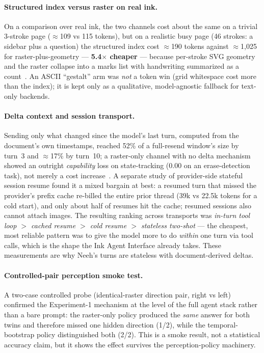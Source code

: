 \documentclass[11pt]{article}
\begin{document}
\paragraph{Structured index versus raster on real ink.} On a comparison over real
ink, the two channels cost about the same on a trivial 3-stroke page
($\approx$109 vs 115 tokens), but on a realistic busy page (46 strokes: a
sidebar plus a question) the structured index cost $\approx$190 tokens against
$\approx$1{,}025 for raster-plus-geometry --- \textbf{5.4$\times$ cheaper} ---
because per-stroke SVG geometry and the raster collapse into a marks list with
handwriting summarized as a count~\cite{adr1}. An ASCII ``gestalt'' arm was
\emph{not} a token win (grid whitespace cost more than the index); it is kept
only as a qualitative, model-agnostic fallback for text-only backends.

\paragraph{Delta context and session transport.} Sending only what changed since
the model's last turn, computed from the document's own timestamps, reached 52\%
of a full-resend window's size by turn~3 and $\approx$17\% by turn~10; a
raster-only channel with no delta mechanism showed an outright \emph{capability}
loss on state-tracking (0.00 on an erase-detection task), not merely a cost
increase~\cite{adr3}. A separate study of provider-side stateful session resume
found it a mixed bargain at best: a resumed turn that missed the provider's
prefix cache re-billed the entire prior thread (39k vs 22.5k tokens for a cold
start), and only about half of resumes hit the cache; resumed sessions also
cannot attach images. The resulting ranking across transports was \emph{in-turn
tool loop $>$ cached resume $>$ cold resume $>$ stateless two-shot} --- the
cheapest, most reliable pattern was to give the model more to do \emph{within}
one turn via tool calls, which is the shape the Ink Agent Interface already
takes. These measurements are why Neeh's turns are stateless with
document-derived deltas.

\paragraph{Controlled-pair perception smoke test.} A two-case controlled probe
(identical-raster direction pair, right vs left) confirmed the Experiment-1
mechanism at the level of the full agent stack rather than a bare prompt: the
raster-only policy produced the \emph{same} answer for both twins and therefore
missed one hidden direction (1/2), while the temporal-bootstrap policy
distinguished both (2/2). This is a smoke result, not a statistical accuracy
claim, but it shows the effect survives the perception-policy machinery.
\end{document}
